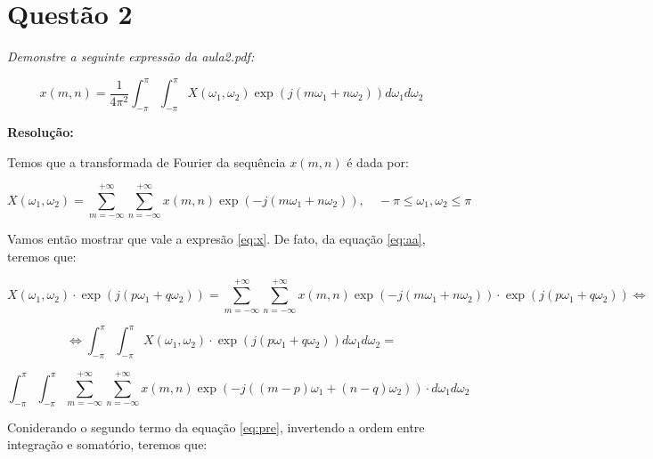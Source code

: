 \documentclass[]{abntex2}
\begin{document}
\section*{\textbf{Questão 2}}

\textit{Demonstre a seguinte expressão da aula2.pdf:}

\begin{equation}
	x(m, n) = \frac{1}{4\pi^2} \int_{-\pi}^{\pi} \int_{-\pi}^{\pi} X(\omega_1, \omega_2) \exp \left( j (m \omega_1 + n \omega_2) \right) d\omega_1 d\omega_2 \label{eq:x}
\end{equation}

\textbf{Resolução:}

Temos que a transformada de Fourier da sequência $x(m,n)$ é dada por:

\begin{center}
\begin{equation}
	X(\omega_1, \omega_2) = \sum_{m=-\infty}^{+\infty} \sum_{n=-\infty}^{+\infty} x(m, n) \exp \left( -j (m \omega_1 + n \omega_2) \right), \quad -\pi \leq \omega_1, \omega_2 \leq \pi	
	\label{eq:aa}
\end{equation}
	
\end{center}

Vamos então mostrar que vale a expresão \ref{eq:x}. De fato, da equação \ref{eq:aa}, teremos que:

\begin{equation*}
	X(\omega_1, \omega_2) \cdot \exp \left( j (p \omega_1 + q \omega_2) \right)= \sum_{m=-\infty}^{+\infty} \sum_{n=-\infty}^{+\infty} x(m, n) \exp \left( -j (m \omega_1 + n \omega_2) \right) \cdot \exp \left( j (p \omega_1 + q \omega_2) \right) \Leftrightarrow 	
\end{equation*}

\begin{equation*}
	\Leftrightarrow \int_{-\pi}^{\pi} \int_{-\pi}^{\pi}X(\omega_1, \omega_2) \cdot \exp \left( j (p \omega_1 + q \omega_2) \right)d\omega_1 d\omega_2= 
\end{equation*}

\begin{equation}
	\int_{-\pi}^{\pi} \int_{-\pi}^{\pi}\sum_{m=-\infty}^{+\infty} \sum_{n=-\infty}^{+\infty} x(m, n) \exp \left( -j ((m-p) \omega_1 + (n-q) \omega_2) \right) \cdot d\omega_1 d\omega_2
	\label{eq:pre}
\end{equation}

Coniderando o segundo termo da equação \ref{eq:pre}, invertendo a ordem entre integração e somatório, teremos que:
\end{document}
